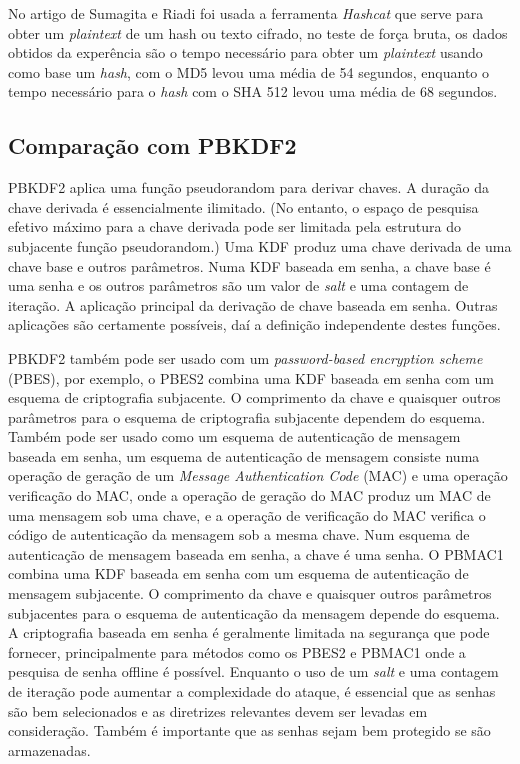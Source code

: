 \documentclass[conference]{IEEEtran}
\begin{document}
No artigo de Sumagita e Riadi \cite{sumagita2018analysis} foi usada a ferramenta \textit{Hashcat} 
que serve para obter um \textit{plaintext} de um hash 
ou texto cifrado, no teste de força bruta, os dados obtidos da experência são o tempo necessário 
para obter um \textit{plaintext} usando como base um \textit{hash}, com o MD5 levou uma média de 54 segundos, 
enquanto o tempo necessário para o \textit{hash} com o SHA 512 levou uma média de 68 segundos. 

\subsection{Comparação com PBKDF2}

PBKDF2 aplica uma função pseudorandom para derivar chaves. A duração da chave 
derivada é essencialmente ilimitado. (No entanto, o espaço de pesquisa efetivo 
máximo para a chave derivada pode ser limitada pela estrutura do subjacente
função pseudorandom.)
Uma KDF produz uma chave derivada de uma chave base e
outros parâmetros. Numa KDF baseada em senha, a chave base é 
uma senha e os outros parâmetros são um valor de \textit{salt} e uma contagem de iteração.
A aplicação principal da derivação de chave baseada em senha. Outras aplicações são 
certamente possíveis, daí a definição independente destes funções. \cite{rfc2898}

PBKDF2 também pode ser usado com um \textit{password-based encryption scheme} (PBES), por exemplo, 
o PBES2 combina uma KDF baseada em senha com um esquema de criptografia 
subjacente. O comprimento da chave e quaisquer outros parâmetros para o esquema de criptografia 
subjacente dependem do esquema. Também pode ser usado como um esquema de autenticação de mensagem 
baseada em senha, um esquema de autenticação de mensagem consiste numa operação de geração de um 
\textit{Message Authentication Code} (MAC) e uma operação verificação do MAC, onde a operação de 
geração do MAC produz um MAC de uma mensagem sob uma chave, e a operação de verificação do MAC verifica o
código de autenticação da mensagem sob a mesma chave. Num esquema de autenticação de mensagem baseada 
em senha, a chave é uma senha. O PBMAC1 combina uma KDF baseada em senha com um
esquema de autenticação de mensagem subjacente. O comprimento da chave e quaisquer outros parâmetros 
subjacentes para o esquema de autenticação da mensagem depende do esquema. A criptografia baseada 
em senha é geralmente limitada na segurança que pode fornecer, principalmente para métodos como os 
PBES2 e PBMAC1 onde a pesquisa de senha offline é possível. Enquanto o uso de um \textit{salt} e uma contagem 
de iteração pode aumentar a complexidade do ataque, é essencial que as senhas são bem selecionados 
e as diretrizes relevantes devem ser levadas em consideração. Também é importante que as senhas sejam
bem protegido se são armazenadas. \cite{rfc8018}
\end{document}
